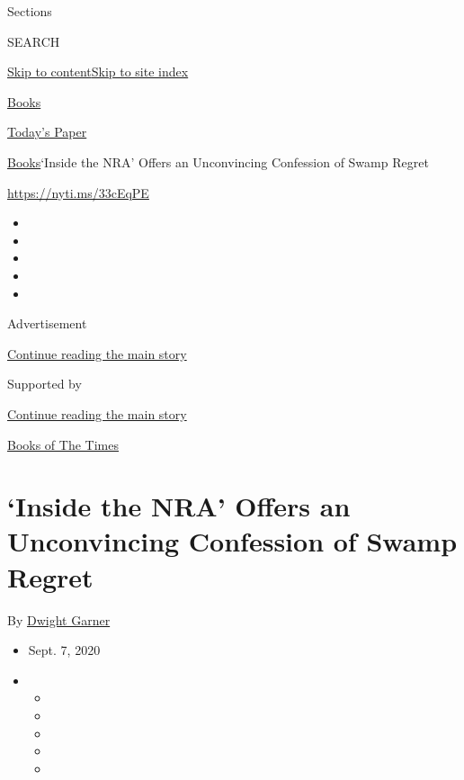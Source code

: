 Sections

SEARCH

\protect\hyperlink{site-content}{Skip to
content}\protect\hyperlink{site-index}{Skip to site index}

\href{https://www.nytimes3xbfgragh.onion/section/books}{Books}

\href{https://myaccount.nytimes3xbfgragh.onion/auth/login?response_type=cookie\&client_id=vi}{}

\href{https://www.nytimes3xbfgragh.onion/section/todayspaper}{Today's
Paper}

\href{/section/books}{Books}\textbar{}`Inside the NRA' Offers an
Unconvincing Confession of Swamp Regret

\url{https://nyti.ms/33cEqPE}

\begin{itemize}
\item
\item
\item
\item
\item
\end{itemize}

Advertisement

\protect\hyperlink{after-top}{Continue reading the main story}

Supported by

\protect\hyperlink{after-sponsor}{Continue reading the main story}

\href{/column/books-of-the-times}{Books of The Times}

\hypertarget{inside-the-nra-offers-an-unconvincing-confession-of-swamp-regret}{%
\section{`Inside the NRA' Offers an Unconvincing Confession of Swamp
Regret}\label{inside-the-nra-offers-an-unconvincing-confession-of-swamp-regret}}

By \href{https://www.nytimes3xbfgragh.onion/by/dwight-garner}{Dwight
Garner}

\begin{itemize}
\item
  Sept. 7, 2020
\item
  \begin{itemize}
  \item
  \item
  \item
  \item
  \item
  \end{itemize}
\end{itemize}

